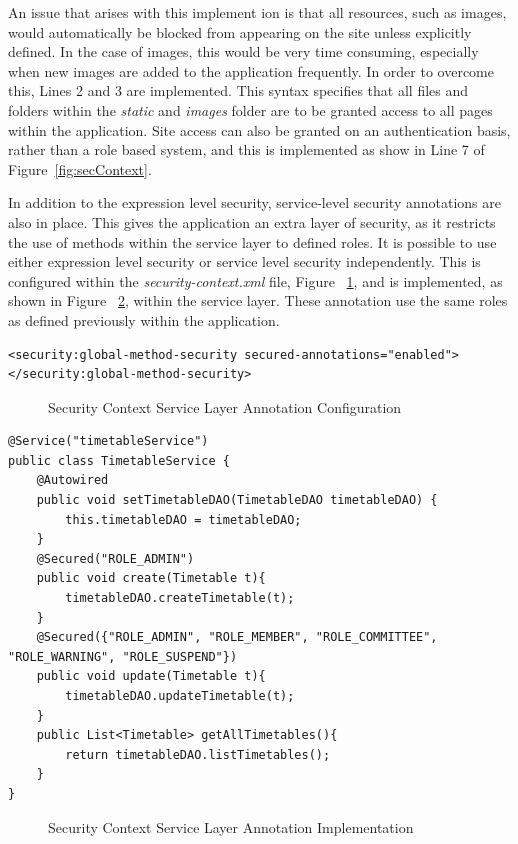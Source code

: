 An issue that arises with this implement ion is that all resources, such as images, would automatically be blocked from appearing on the site unless explicitly defined. In the case of images, this would be very time consuming, especially when new images are added to the application frequently. In order to overcome this, Lines 2 and 3 are implemented. This syntax specifies that all files and folders within the \textit{static} and \textit{images} folder are to be granted access to all pages within the application. Site access can also be granted on an authentication basis, rather than a role based system, and this is implemented as show in Line 7 of Figure~\ref{fig:secContext}.

In addition to the expression level security, service-level security annotations are also in place. This gives the application an extra layer of security, as it restricts the use of methods within the service layer to defined roles. It is possible to use either expression level security or service level security independently. This is configured within the \textit{security-context.xml} file, Figure ~\ref{fig:secAnnotate}, and is implemented, as shown in Figure ~\ref{fig:secAnonImpl}, within the service layer. These annotation use the same roles as defined previously within the application. 

\begin{lstlisting}
<security:global-method-security secured-annotations="enabled"></security:global-method-security>
\end{lstlisting}
\begin{figure}[H]
\caption{Security Context Service Layer Annotation Configuration}
\label{fig:secAnnotate}
\end{figure}
\begin{lstlisting}
@Service("timetableService")
public class TimetableService {
	@Autowired
	public void setTimetableDAO(TimetableDAO timetableDAO) {
		this.timetableDAO = timetableDAO;
	}
	@Secured("ROLE_ADMIN")
	public void create(Timetable t){
		timetableDAO.createTimetable(t);
	}
	@Secured({"ROLE_ADMIN", "ROLE_MEMBER", "ROLE_COMMITTEE", "ROLE_WARNING", "ROLE_SUSPEND"})
	public void update(Timetable t){
		timetableDAO.updateTimetable(t);
	}
	public List<Timetable> getAllTimetables(){
		return timetableDAO.listTimetables();
	}
}
\end{lstlisting}
\begin{figure}[H]
\caption{Security Context Service Layer Annotation Implementation}
\label{fig:secAnonImpl}
\end{figure}

